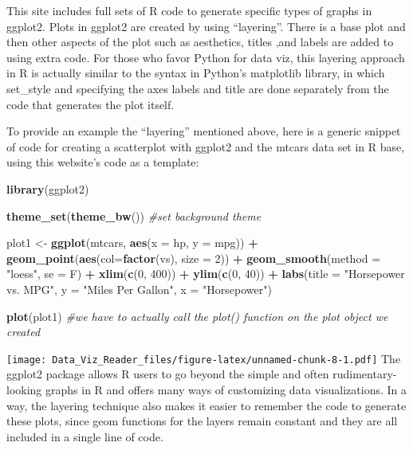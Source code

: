 \documentclass[]{book}
\newenvironment{Shaded}{\begin{snugshade}}{\end{snugshade}}
\newcommand{\KeywordTok}[1]{\textcolor[rgb]{0.13,0.29,0.53}{\textbf{#1}}}
\newcommand{\DataTypeTok}[1]{\textcolor[rgb]{0.13,0.29,0.53}{#1}}
\newcommand{\DecValTok}[1]{\textcolor[rgb]{0.00,0.00,0.81}{#1}}
\newcommand{\StringTok}[1]{\textcolor[rgb]{0.31,0.60,0.02}{#1}}
\newcommand{\CommentTok}[1]{\textcolor[rgb]{0.56,0.35,0.01}{\textit{#1}}}
\newcommand{\OperatorTok}[1]{\textcolor[rgb]{0.81,0.36,0.00}{\textbf{#1}}}
\newcommand{\NormalTok}[1]{#1}
\theoremstyle{definition}
\theoremstyle{definition}
\theoremstyle{definition}
\theoremstyle{remark}
\begin{document}
\citep{viz_R}

This site includes full sets of R code to generate specific types of
graphs in ggplot2. Plots in ggplot2 are created by using ``layering''.
There is a base plot and then other aspects of the plot such as
aesthetics, titles ,and labels are added to using extra code. For those
who favor Python for data viz, this layering approach in R is actually
similar to the syntax in Python's matplotlib library, in which
set\_style and specifying the axes labels and title are done separately
from the code that generates the plot itself.

To provide an example the ``layering'' mentioned above, here is a
generic snippet of code for creating a scatterplot with ggplot2 and the
mtcars data set in R base, using this website's code as a template:

\begin{Shaded}
\begin{Highlighting}[]
\KeywordTok{library}\NormalTok{(ggplot2)}

\KeywordTok{theme_set}\NormalTok{(}\KeywordTok{theme_bw}\NormalTok{())  }\CommentTok{#set background theme}

\NormalTok{plot1 <-}\StringTok{ }\KeywordTok{ggplot}\NormalTok{(mtcars, }\KeywordTok{aes}\NormalTok{(}\DataTypeTok{x =}\NormalTok{ hp, }\DataTypeTok{y =}\NormalTok{ mpg)) }\OperatorTok{+}\StringTok{ }\KeywordTok{geom_point}\NormalTok{(}\KeywordTok{aes}\NormalTok{(}\DataTypeTok{col=}\KeywordTok{factor}\NormalTok{(vs), }\DataTypeTok{size =} \DecValTok{2}\NormalTok{)) }\OperatorTok{+}\StringTok{ }\KeywordTok{geom_smooth}\NormalTok{(}\DataTypeTok{method =} \StringTok{"loess"}\NormalTok{, }\DataTypeTok{se =}\NormalTok{ F) }\OperatorTok{+}\StringTok{ }\KeywordTok{xlim}\NormalTok{(}\KeywordTok{c}\NormalTok{(}\DecValTok{0}\NormalTok{, }\DecValTok{400}\NormalTok{)) }\OperatorTok{+}\StringTok{ }\KeywordTok{ylim}\NormalTok{(}\KeywordTok{c}\NormalTok{(}\DecValTok{0}\NormalTok{, }\DecValTok{40}\NormalTok{)) }\OperatorTok{+}\StringTok{ }\KeywordTok{labs}\NormalTok{(}\DataTypeTok{title =} \StringTok{"Horsepower vs. MPG"}\NormalTok{, }\DataTypeTok{y =} \StringTok{"Miles Per Gallon"}\NormalTok{, }\DataTypeTok{x =} \StringTok{"Horsepower"}\NormalTok{)}

\KeywordTok{plot}\NormalTok{(plot1)  }\CommentTok{#we have to actually call the plot() function on the plot object we created}
\end{Highlighting}
\end{Shaded}

\texttt{[image: Data\_Viz\_Reader\_files/figure-latex/unnamed-chunk-8-1.pdf]}
The ggplot2 package allows R users to go beyond the simple and often
rudimentary-looking graphs in R and offers many ways of customizing data
visualizations. In a way, the layering technique also makes it easier to
remember the code to generate these plots, since geom functions for the
layers remain constant and they are all included in a single line of
code.
\end{document}
